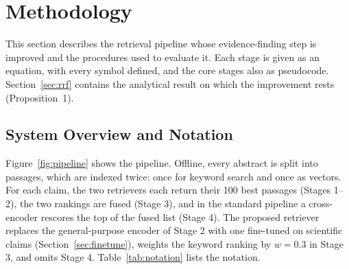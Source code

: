 \section{Methodology}
\label{sec:method}

This section describes the retrieval pipeline whose evidence-finding step is improved and the
procedures used to evaluate it. Each stage is given as an equation, with every symbol defined,
and the core stages also as pseudocode. Section~\ref{sec:rrf} contains the analytical result on
which the improvement rests (Proposition~1).

\subsection{System Overview and Notation}
\label{sec:overview}

Figure~\ref{fig:pipeline} shows the pipeline. Offline, every abstract is split into passages,
which are indexed twice: once for keyword search and once as vectors. For each claim, the two
retrievers each return their 100 best passages (Stages 1--2), the two rankings are fused
(Stage 3), and in the standard pipeline a cross-encoder rescores the top of the fused list
(Stage 4). The proposed retriever replaces the general-purpose encoder of Stage 2 with one
fine-tuned on scientific claims (Section~\ref{sec:finetune}), weights the keyword ranking by
$w = 0.3$ in Stage 3, and omits Stage 4. Table~\ref{tab:notation} lists the notation.

